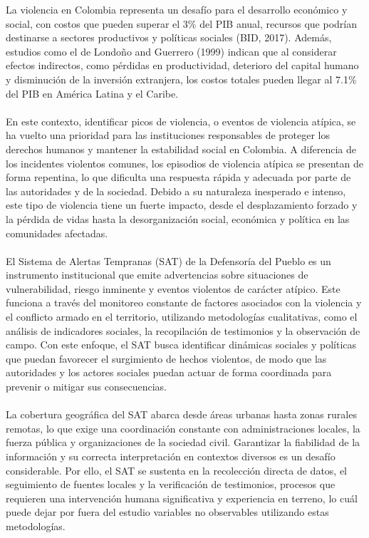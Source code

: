 La violencia en Colombia representa un desafío para el desarrollo económico y social, con costos que pueden superar el 3\% del PIB anual, recursos que podrían destinarse a sectores productivos y políticas sociales (BID, 2017). Además, estudios como el de Londoño and Guerrero (1999) indican que al considerar efectos indirectos, como pérdidas en productividad, deterioro del capital humano y disminución de la inversión extranjera,  los costos totales pueden llegar al 7.1\% del PIB en América Latina y el Caribe.
\\\\
En este contexto, identificar picos de violencia, o eventos de violencia atípica, se ha vuelto una prioridad para las instituciones responsables de proteger los derechos humanos y mantener la estabilidad social en Colombia. A diferencia de los incidentes violentos comunes, los episodios de violencia atípica se presentan de forma repentina, lo que dificulta una respuesta rápida y adecuada por parte de las autoridades y de la sociedad. Debido a su naturaleza inesperado e intenso, este tipo de violencia tiene un fuerte impacto, desde el desplazamiento forzado y la pérdida de vidas hasta la desorganización social, económica y política en las comunidades afectadas.
\\\\
El Sistema de Alertas Tempranas (SAT) de la Defensoría del Pueblo es un instrumento institucional que emite advertencias sobre situaciones de vulnerabilidad, riesgo inminente y eventos violentos de carácter atípico. Este funciona a través del monitoreo constante de factores asociados con la violencia y el conflicto armado en el territorio, utilizando metodologías cualitativas, como el análisis de indicadores sociales, la recopilación de testimonios y la observación de campo. Con este enfoque, el SAT busca identificar dinámicas sociales y políticas que puedan favorecer el surgimiento de hechos violentos, de modo que las autoridades y los actores sociales puedan actuar de forma coordinada para prevenir o mitigar sus consecuencias.
\\\\
La cobertura geográfica del SAT abarca desde áreas urbanas hasta zonas rurales remotas, lo que exige una coordinación constante con administraciones locales, la fuerza pública y organizaciones de la sociedad civil. Garantizar la fiabilidad de la información y su correcta interpretación en contextos diversos es un desafío considerable. Por ello, el SAT se sustenta en la recolección directa de datos, el seguimiento de fuentes locales y la verificación de testimonios, procesos que requieren una intervención humana significativa y experiencia en terreno, lo cuál puede dejar por fuera del estudio variables no observables utilizando estas metodologías.
